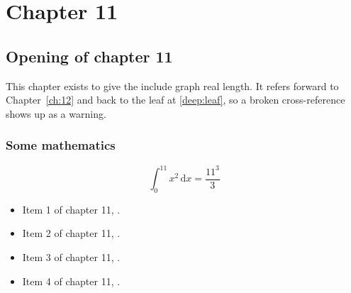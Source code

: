 \chapter{Chapter 11}
\label{ch:11}
\section{Opening of chapter 11}
This chapter exists to give the include graph real length. It refers
forward to Chapter~\ref{ch:12} and back to the leaf
at \ref{deep:leaf}, so a broken cross-reference shows up as a warning.

\subsection{Some mathematics}
\begin{equation}
  \int_0^{11} x^{2} \, \mathrm{d}x = \frac{11^{3}}{3}
\end{equation}

\begin{itemize}
  \item Item 1 of chapter 11, .
  \item Item 2 of chapter 11, .
  \item Item 3 of chapter 11, .
  \item Item 4 of chapter 11, .
\end{itemize}
